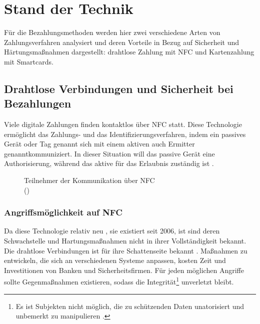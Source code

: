 \section{Stand der Technik}

Für die Bezahlungsmethoden werden hier zwei verschiedene Arten von Zahlungsverfahren analysiert und deren
Vorteile in Bezug auf Sicherheit und Härtungsmaßnahmen dargestellt: drahtlose Zahlung mit NFC und 
Kartenzahlung mit Smartcards.

\subsection{Drahtlose Verbindungen und Sicherheit bei Bezahlungen}

Viele digitale Zahlungen finden kontaktlos über NFC statt. Diese Technologie ermöglicht das Zahlungs- und
das Identifizierungsverfahren, indem ein passives Gerät oder Tag genannt sich mit einem aktiven 
auch Ermitter genanntkommuniziert. In dieser Situation will das passive Gerät eine Authorisierung,
während das aktive für das Erlaubnis zuständig ist \cite{refart:NFNK}. 

\begin{figure}[H]
   \caption{Teilnehmer der Kommunikation über NFC\\(\cite{refart:GPIN})}
   \label{fig:refart_GPIN}
\end{figure}


\subsubsection{Angriffsmöglichkeit auf NFC}

Da diese Technologie relativ neu \cite{refip:NTAS}, sie existiert seit 2006, ist sind deren Schwachstelle 
und Hartungsmaßnahmen nicht in ihrer Vollständigkeit bekannt. Die drahtlose Verbindungen ist für ihre Schattenseite 
bekannt \cite{refip:NYRS}. Maßnahmen zu entwickeln, die sich an verschiedenen Systeme anpassen, kosten Zeit 
und Investitionen von Banken und Sicherheitsfirmen. Für jeden möglichen Angriffe sollte Gegenmaßnahmen existieren, 
sodass die Integrität\footnote{Es ist Subjekten nicht möglich, die zu schützenden Daten unatorisiert und 
unbemerkt zu manipulieren \cite{refbook:SWIS}.} unverletzt bleibt.

